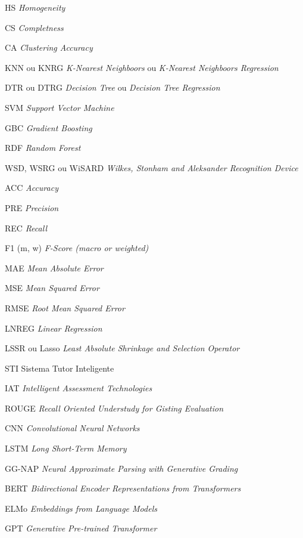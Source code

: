 \documentclass[
	12pt,				%
	openright,			%
	twoside,			%
	a4paper,			%
	english,			%
	french,				%
	spanish,			%
	brazil				%
	]{abntex2}
\begin{document}
\begin{siglas}
  \item[HS] \textit{Homogeneity}
  \item[CS] \textit{Completness}
  \item[CA] \textit{Clustering Accuracy}
  \item[KNN ou KNRG] \textit{K-Nearest Neighboors} ou \textit{K-Nearest Neighboors Regression}
  \item[DTR ou DTRG] \textit{Decision Tree} ou \textit{Decision Tree Regression}
  \item[SVM] \textit{Support Vector Machine}
  \item[GBC] \textit{Gradient Boosting}
  \item[RDF] \textit{Random Forest}
  \item[WSD, WSRG ou WiSARD] \textit{Wilkes, Stonham and Aleksander Recognition Device}
  \item[ACC] \textit{Accuracy}
  \item[PRE] \textit{Precision}
  \item[REC] \textit{Recall}
  \item[F1 (m, w)] \textit{F-Score (macro or weighted)}
  \item[MAE] \textit{Mean Absolute Error}
  \item[MSE] \textit{Mean Squared Error}
  \item[RMSE] \textit{Root Mean Squared Error}
  \item[LNREG] \textit{Linear Regression}
  \item[LSSR ou Lasso] \textit{Least Absolute Shrinkage and Selection Operator}
  \item[STI] Sistema Tutor Inteligente
  \item[IAT] \textit{Intelligent Assessment Technologies}
  \item[ROUGE] \textit{Recall Oriented Understudy for Gisting Evaluation}
  \item[CNN] \textit{Convolutional Neural Networks}
  \item[LSTM] \textit{Long Short-Term Memory}
  \item[GG-NAP] \textit{Neural Approximate Parsing with Generative Grading}
  \item[BERT] \textit{Bidirectional Encoder Representations from Transformers}
  \item[ELMo] \textit{Embeddings from Language Models}
  \item[GPT] \textit{Generative Pre-trained Transformer}
\end{siglas}
\end{document}
